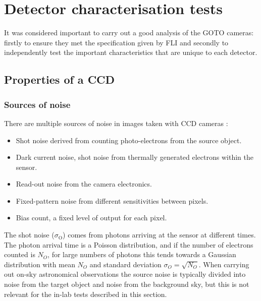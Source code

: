 \section{Detector characterisation tests}
\label{sec:detectors}
\begin{colsection}


\begin{colsection}

It was considered important to carry out a good analysis of the GOTO cameras: firstly to ensure they met the specification given by FLI and secondly to independently test the important characteristics that are unique to each detector.

\end{colsection}

\newpage
\subsection{Properties of a CCD}
\label{sec:CCDs}
\begin{colsection}

\newpage
\subsubsection{Sources of noise}

There are multiple sources of noise in images taken with CCD cameras \citep{CCDs}:

\begin{itemize}
    \item Shot noise derived from counting photo-electrons from the source object.
    \item Dark current noise, shot noise from thermally generated electrons within the sensor.
    \item Read-out noise from the camera electronics.
    \item Fixed-pattern noise from different sensitivities between pixels.
    \item Bias count, a fixed level of output for each pixel.
\end{itemize}

The shot noise ($\sigma_\text{O}$) comes from photons arriving at the sensor at different times. The photon arrival time is a Poisson distribution, and if the number of electrons counted is $N_O$, for large numbers of photons this tends towards a Gaussian distribution with mean $N_O$ and standard deviation $\sigma_O = \sqrt{N_O}$. When carrying out on-sky astronomical observations the source noise is typically divided into noise from the target object and noise from the background sky, but this is not relevant for the in-lab tests described in this section.


\end{colsection}
\end{colsection}
